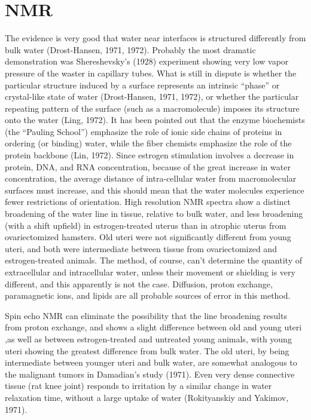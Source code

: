 \section{NMR}

The evidence is very good that water near interfaces is structured differently from bulk water (Drost-Hansen, 1971, 1972). Probably the most dramatic demonstration was Shereshevsky's (1928) experiment showing very low vapor pressure of the waster in capillary tubes. What is still in dispute is whether the particular structure induced by a surface represents an intrinsic ``phase'' or crystal-like state of water (Drost-Hansen, 1971, 1972), or whether the particular repeating pattern of the surface (such as a macromolecule) imposes its structure onto the water (Ling, 1972). It has been pointed out that the enzyme biochemists (the ``Pauling School'') emphasize the role of ionic side chains of proteins in ordering (or binding) water, while the fiber chemists emphasize the role of the protein backbone (Lin, 1972). Since estrogen stimulation involves a decrease in protein, DNA, and RNA concentration, because of the great increase in water concentration, the average distance of intra-cellular water from macromolecular surfaces must increase, and this should mean that the water molecules experience fewer restrictions of orientation. High resolution NMR spectra show a distinct broadening of the water line in tissue, relative to bulk water, and less broadening (with a shift upfield) in estrogen-treated uterus than in atrophic uterus from ovariectomized hamsters. Old uteri were not significantly different from young uteri, and both were intermediate between tissue from ovariectomized and estrogen-treated animals. The method, of course, can't determine the quantity of extracellular and intracellular water, unless their movement or shielding is very different, and this apparently is not the case. Diffusion, proton exchange, paramagnetic ions, and lipids are all probable sources of error in this method.

Spin echo NMR can eliminate the possibility that the line broadening results from proton exchange, and shows a slight difference between old and young uteri ,as well as between estrogen-treated and untreated young animals, with young uteri showing the greatest difference from bulk water. The old uteri, by being intermediate between younger uteri and bulk water, are somewhat analogous to the malignant tumors in Damadian's study (1971). Even very dense connective tissue (rat knee joint) responds to irritation by a similar change in water relaxation time, without a large uptake of water (Rokityanskiy and Yakimov, 1971).

